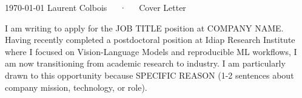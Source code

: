 \documentclass[11pt, a4paper]{awesome-cv}
\begin{document}
\makecvheader[R]

\makecvfooter
  {\today}
  {Laurent Colbois~~~·~~~Cover Letter}
  {}

\makelettertitle

\begin{cvletter}

I am writing to apply for the JOB TITLE position at COMPANY NAME. Having recently completed a postdoctoral position at Idiap Research Institute where I focused on Vision-Language Models and reproducible ML workflows, I am now transitioning from academic research to industry. I am particularly drawn to this opportunity because SPECIFIC REASON (1-2 sentences about company mission, technology, or role).



%
%


\end{cvletter}
\end{document}
